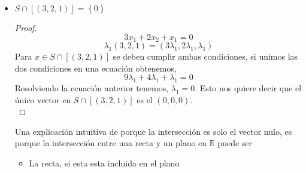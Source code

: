 \documentclass[11pt]{article}
\begin{document}
\begin{enumerate}
\begin{enumerate}
\begin{itemize}
\begin{proof}
                  \[ \lambda_3 (3,1,0) + \lambda_4 (2,2,-1) = (3\lambda_3 + 2\lambda_4
                      , \lambda_3  + 2 \lambda_4, - \lambda_4) 
                  \tag{Condicion para pertenecer a $W$} \]
                  Para $x \in W \cap T$ se deben cumplir ambas condiciones,
                  si unimos las dos condiciones obtenemos,
                  \[ (\lambda_1, \lambda_1 + \lambda_2, 2 \lambda_1 - \lambda_2) =
                  (\lambda_3 + 2\lambda_4, \lambda_3  + 2 \lambda_4, - \lambda_4) \] 
                  Resolvemos el sistema de 3 ecuaciones y 4 incógnitas y obtenemos,
                  \[ \begin{cases}
                      \lambda_1 =& \frac{1}{8} \lambda_4 \\
                      \lambda_2 =& \frac{5}{4} \lambda_4 \\
                      \lambda_3 =& \frac{-5}{8} \lambda_4 \\
                      \lambda_4 & variable \ libre 
                  \end{cases} \]
                  Usando el resultado anterior y cualquiera de las dos condiciones 
                  de pertenencia obtenemos,
                  \[ \lambda_4 \left(\frac{1}{8}, \frac{11}{8}, -1 \right) \]
                \end{proof}
              \item $S \cap[(3,2,1)] = \left\{ 0 \right\}$
                \begin{proof}
                  \[ 3 x_1 + 2 x_2 + x_1 = 0 \tag{Condicion para pertenecer a $S$}\]
                  \[ \lambda_1 (3,2,1) = (3\lambda_1, 2\lambda_1, \lambda_1) 
                  \tag{Condicion para pertenecer a $[(3,2,1)]$} \]
                  Para $x \in S \cap [(3,2,1)]$ se deben cumplir ambas condiciones,
                  si unimos las dos condiciones en una ecuación obtenemos,
                  \[ 9 \lambda_1 + 4 \lambda_1 + \lambda_1 = 0\]
                  Resolviendo la ecuación anterior tenemos, $\lambda_1 = 0$.
                  Esto nos quiere decir que el único vector en $ S \cap [(3,2,1)]$ 
                  es el $(0,0,0)$.\\
                \end{proof}  
                Una explicación intuitiva de porque la intersección es solo el vector
                nulo, es porque la intersección entre una recta y un plano en 
                $\mathbb{R}$ puede ser 
                \begin{itemize}
                  \item La recta, si esta esta incluida en el plano

\end{itemize}
\end{itemize}
\end{enumerate}
\end{enumerate}
\end{document}
